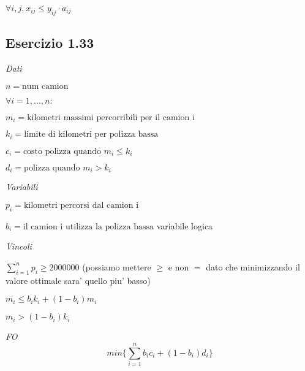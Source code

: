 $ \forall i,j.\ x_{ij} \leq y_{ij} \cdot a_{ij} $

\subsection{Esercizio 1.33}

\textit{Dati}

$ n = \text{num camion} $

$ \forall i = 1,...,n: $

$ m_i = \text{kilometri massimi percorribili per il camion i} $

$ k_i = \text{limite di kilometri per polizza bassa} $

$ c_i = \text{costo polizza quando } m_i \leq k_i $

$ d_i = \text{polizza quando } m_i > k_i $

\textit{Variabili}

$ p_i = \text{kilometri percorsi dal camion i} $

$ b_i = \text{il camion i utilizza la polizza bassa} $ variabile logica

\textit{Vincoli}

$ \sum_{i=1}^{n} p_i \geq 2000000 $ (possiamo mettere $ \geq $ e non $ = $ dato che minimizzando il valore ottimale sara' quello piu' basso)

$ m_i \leq b_i k_i + (1-b_i) m_i $

$ m_i > (1-b_i) k_i $

\textit{FO}
\[
  min \{\sum_{i=1}^{n} b_i c_i + (1-b_i) d_i \}
\]
